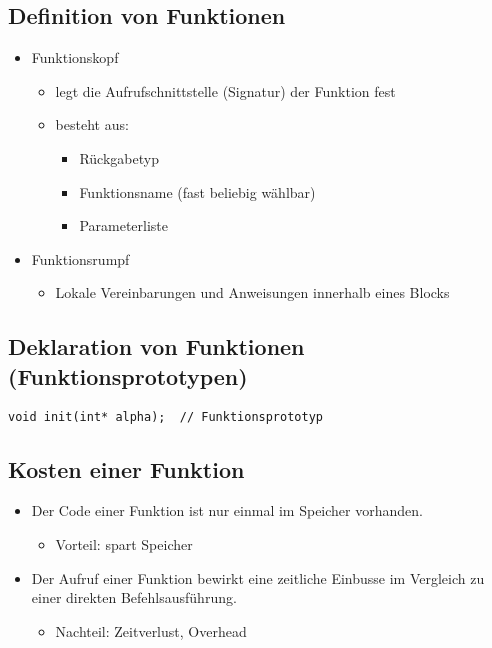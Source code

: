\subsection{Definition von Funktionen}
\begin{itemize}
	\item Funktionskopf
	\begin{itemize}
		\item legt die Aufrufschnittstelle (Signatur) der Funktion fest
		\item besteht aus:
		\begin{itemize}
			\item Rückgabetyp
			\item Funktionsname (fast beliebig wählbar)
			\item Parameterliste
		\end{itemize}
	\end{itemize}
	\item Funktionsrumpf
	\begin{itemize}
		\item Lokale Vereinbarungen und Anweisungen innerhalb eines Blocks
	\end{itemize}
\end{itemize}

\subsection{Deklaration von Funktionen (Funktionsprototypen)}
\vspace{-\baselineskip}
\begin{minipage}{0.6\linewidth}
\begin{lstlisting}
void init(int* alpha);	// Funktionsprototyp
\end{lstlisting}
\end{minipage}

\subsection{Kosten einer Funktion}
\begin{itemize}
	\item Der Code einer Funktion ist nur einmal im Speicher vorhanden.
	\begin{itemize}
		\item Vorteil: spart Speicher
	\end{itemize}
	\item Der Aufruf einer Funktion bewirkt eine zeitliche Einbusse im Vergleich zu einer direkten Befehlsausführung.
	\begin{itemize}
		\item Nachteil: Zeitverlust, Overhead
	\end{itemize}
\end{itemize}

